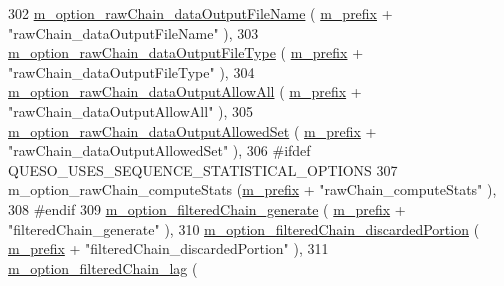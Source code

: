 \begin{DoxyCode}
302   \hyperlink{class_q_u_e_s_o_1_1_metropolis_hastings_s_g_options_a28d13976ef26bc450575528a37e1eeb6}{m\_option\_rawChain\_dataOutputFileName}               (
      \hyperlink{class_q_u_e_s_o_1_1_metropolis_hastings_s_g_options_a4f7c510aaa530336d24259e2a89f5d0b}{m\_prefix} + \textcolor{stringliteral}{"rawChain\_dataOutputFileName"}               ),
303   \hyperlink{class_q_u_e_s_o_1_1_metropolis_hastings_s_g_options_ae0bc37e9e5982b51f67e9788e4397cfa}{m\_option\_rawChain\_dataOutputFileType}               (
      \hyperlink{class_q_u_e_s_o_1_1_metropolis_hastings_s_g_options_a4f7c510aaa530336d24259e2a89f5d0b}{m\_prefix} + \textcolor{stringliteral}{"rawChain\_dataOutputFileType"}               ),
304   \hyperlink{class_q_u_e_s_o_1_1_metropolis_hastings_s_g_options_a336b749a8e06848243cf5bfbab2e43a6}{m\_option\_rawChain\_dataOutputAllowAll}               (
      \hyperlink{class_q_u_e_s_o_1_1_metropolis_hastings_s_g_options_a4f7c510aaa530336d24259e2a89f5d0b}{m\_prefix} + \textcolor{stringliteral}{"rawChain\_dataOutputAllowAll"}               ),
305   \hyperlink{class_q_u_e_s_o_1_1_metropolis_hastings_s_g_options_a53a51bf8aa24d9dbe4a9115453bd9e2b}{m\_option\_rawChain\_dataOutputAllowedSet}             (
      \hyperlink{class_q_u_e_s_o_1_1_metropolis_hastings_s_g_options_a4f7c510aaa530336d24259e2a89f5d0b}{m\_prefix} + \textcolor{stringliteral}{"rawChain\_dataOutputAllowedSet"}             ),
306 \textcolor{preprocessor}{#ifdef QUESO\_USES\_SEQUENCE\_STATISTICAL\_OPTIONS}
307 \textcolor{preprocessor}{}  m\_option\_rawChain\_computeStats                     (\hyperlink{class_q_u_e_s_o_1_1_metropolis_hastings_s_g_options_a4f7c510aaa530336d24259e2a89f5d0b}{m\_prefix} + \textcolor{stringliteral}{"rawChain\_computeStats"}           
                ),
308 \textcolor{preprocessor}{#endif}
309 \textcolor{preprocessor}{}  \hyperlink{class_q_u_e_s_o_1_1_metropolis_hastings_s_g_options_abb60803a2ba0d32816a1ac9ad67fe7fd}{m\_option\_filteredChain\_generate}                    (
      \hyperlink{class_q_u_e_s_o_1_1_metropolis_hastings_s_g_options_a4f7c510aaa530336d24259e2a89f5d0b}{m\_prefix} + \textcolor{stringliteral}{"filteredChain\_generate"}                    ),
310   \hyperlink{class_q_u_e_s_o_1_1_metropolis_hastings_s_g_options_a6bc7417585b95eb59cedece39b5d5361}{m\_option\_filteredChain\_discardedPortion}            (
      \hyperlink{class_q_u_e_s_o_1_1_metropolis_hastings_s_g_options_a4f7c510aaa530336d24259e2a89f5d0b}{m\_prefix} + \textcolor{stringliteral}{"filteredChain\_discardedPortion"}            ),
311   \hyperlink{class_q_u_e_s_o_1_1_metropolis_hastings_s_g_options_aa3e984a031cf626281bccd866e603865}{m\_option\_filteredChain\_lag}                         (

\end{DoxyCode}
